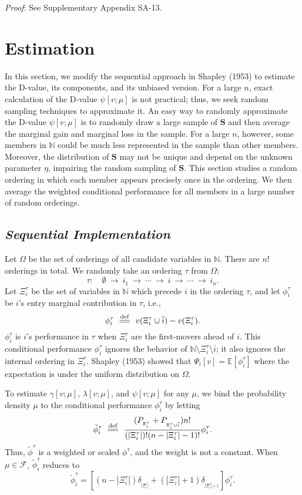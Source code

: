 \documentclass[a4paper,12pt]{article}
\newcommand{\eqdef}{\overset{\mathrm{def}}{=\joinrel=}}
\begin{document}
\noindent \textit{Proof}: See Supplementary Appendix SA-13.



\section{Estimation}\label{sect:est_algorthms}
\noindent 
In this section, we modify the sequential approach in Shapley (1953) to estimate the D-value, its components, and its unbiased version.
For a large $n$, exact calculation of the D-value $\psi[v;\mu]$ is not practical; 
thus, we seek random sampling techniques to approximate it.
An easy way to randomly approximate the D-value $\psi[v; \mu]$ 
is to randomly draw a large sample of $\mathbf{S}$ and then average the marginal gain and marginal loss
in the sample. For a large $n$, however, some members in $\mathbb{N}$ 
could be much less represented in the sample than other members. 
Moreover,
the distribution of $\mathbf{S}$ may not be unique and depend on the unknown parameter $\eta$, impairing the random sampling of $\mathbf{S}$.
This section studies a random ordering in which each member appears precisely once in the ordering. 
We then average the weighted conditional performance for all members in a large number of random orderings.


\subsection{\textit{Sequential Implementation}}
\noindent Let $\Omega$ be the set of orderings of all candidate variables in $\mathbb{N}$.
There are $n!$ orderings in total. We randomly take an ordering $\tau$ from $\Omega$:
$$
\tau: \quad \emptyset\ \longrightarrow \  i_1\ \longrightarrow \ \cdots\  \longrightarrow \ i\ \longrightarrow \ \cdots\ \longrightarrow \ i_n.
$$
Let 
$\Xi_i^\tau$ be the set of variables in $\mathbb{N}$ which precede $i$ in the ordering $\tau$, and let
$\phi^\tau_i$ be $i$'s entry marginal contribution in $\tau$, i.e.,
$$
\phi^\tau_i \ \eqdef \ v(\Xi_i^\tau \cup \overline{i}) - v(\Xi_i^\tau).
$$
$\phi^\tau_i$ is $i$'s performance in $\tau$ when $\Xi_i^\tau$ are the first-movers ahead of $i$.
This conditional performance $\phi^\tau_i$ ignores the behavior of $\mathbb{N} \setminus \Xi_i^\tau \setminus \overline{i}$;
it also ignores the internal ordering in $\Xi_i^\tau$.
Shapley (1953) showed that $\Psi_i [v] = \mathbb{E} [\phi^\tau_i] $ 
where the expectation is under the uniform distribution on $\Omega$.

To estimate $\gamma[v;\mu]$, $\lambda[v;\mu]$, and $\psi[v;\mu]$ for any $\mu$, we  
bind the probability density $\mu$ to the conditional performance $\phi^\tau_i$ by letting
\begin{equation}\label{eq:variant_tau_phi}
\tilde \phi^\tau_i \
\eqdef \
\frac{(P_{_{\Xi_i^\tau}}+P_{_{\Xi_i^\tau \cup \overline{i}}}) n!}{(|\Xi_i^\tau|)!(n-|\Xi_i^\tau| - 1)!}\phi^\tau_i.
\end{equation}
Thus, $\tilde \phi^\tau$ is a weighted or scaled $\phi^\tau$, and the weight is not a constant.
When $\mu \in \mathscr{F}$, $\tilde \phi^\tau_i$ reduces to
$$
\tilde \phi^\tau_i = \left [ (n-|\Xi_i^\tau|)\delta_{_{|\Xi_i^\tau|}} + (|\Xi_i^\tau|+1) \delta_{_{|\Xi_i^\tau|+1}} \right ] \phi^\tau_i. 
$$
\end{document}
